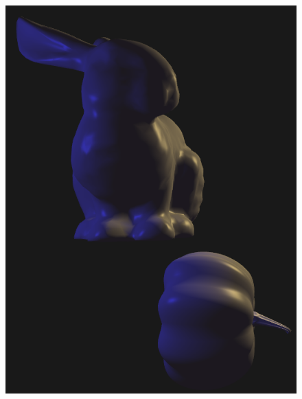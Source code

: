 \documentclass[acmtog]{acmart}
\begin{document}
\begin{figure}[h]
{\begin{minipage}[b]{.4\linewidth}
		\includegraphics[scale=0.25]{left.png}
	\end{minipage}
}
\end{figure}
\end{document}
